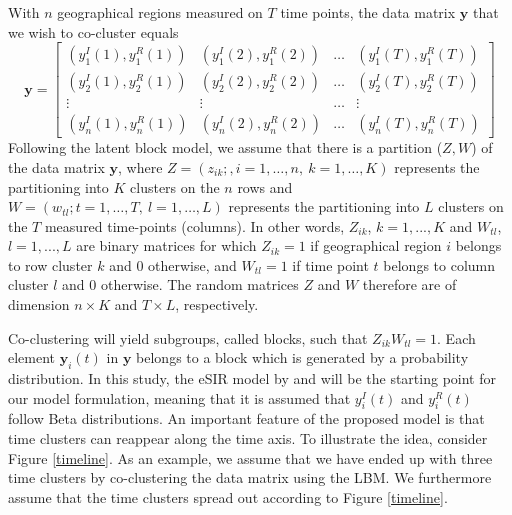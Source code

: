 \documentclass[10pt,a4paper]{article}
\begin{document}
With $n$ geographical regions measured on $T$ time points, the data matrix $\mathbf{y}$ that we wish to co-cluster equals
%
$$
\mathbf{y} = \begin{bmatrix}
	(y^I_1(1), y^R_1(1)) & (y^I_1(2), y^R_1(2)) & \ldots & (y^I_1(T), y^R_1(T))\\
	(y^I_2(1), y^R_2(1)) & (y^I_2(2), y^R_2(2)) & \ldots & (y^I_2(T), y^R_2(T))\\
	\vdots & \vdots & \ldots & \vdots \\
	(y^I_n(1), y^R_n(1)) & (y^I_n(2), y^R_n(2)) & \ldots & (y^I_n(T), y^R_n(T))
\end{bmatrix}
$$
%
Following the latent block model, we assume that there is a partition ($Z, W$) of the data matrix $\mathbf{y}$, where $Z = (z_{ik}; , i=1,\ldots, n, \: k = 1,\ldots, K)$ represents the partitioning into $K$ clusters on the $n$ rows and $W = (w_{tl}; t=1,\ldots, T, \: l=1,\ldots, L)$ represents the partitioning into $L$ clusters on the $T$ measured time-points (columns). In other words, $Z_{ik}$, $k = 1,..., K$ and $W_{tl}$, $l = 1,..., L$ are binary matrices for which $Z_{ik} = 1$ if geographical region $i$ belongs to row cluster $k$ and $0$ otherwise, and $W_{tl} = 1$ if time point $t$ belongs to column cluster $l$ and $0$ otherwise. The random matrices $Z$ and $W$ therefore are of dimension $n \times K$ and $T \times L$, respectively. 

Co-clustering will yield subgroups, called blocks, such that $Z_{ik} W_{tl} = 1$. Each element $\mathbf{y}_{i}(t)$ in $\mathbf{y}$ belongs to a block which is generated by a probability distribution. In this study, the eSIR model by \cite{osthus2017forecasting} and \cite{song2020epidemiological} will be the starting point for our model formulation, meaning that it is assumed that $y_{i}^I(t)$ and $y_{i}^R(t)$ follow Beta distributions. An important feature of the proposed model is that time clusters can reappear along the time axis. To illustrate the idea, consider Figure \ref{timeline}. As an example, we assume that we have ended up with three time clusters by co-clustering the data matrix using the LBM. We furthermore assume that the time clusters spread out according to Figure \ref{timeline}. 
\end{document}

